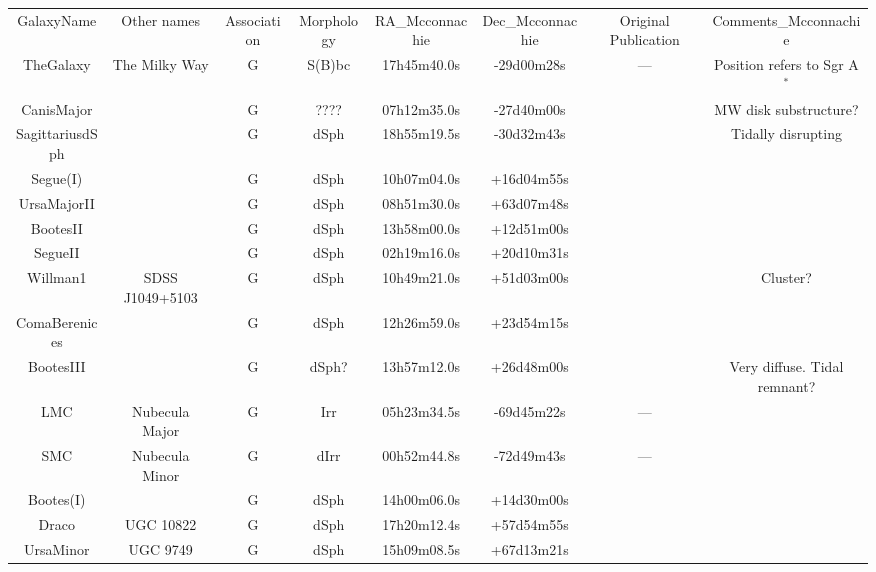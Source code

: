 \begin{table}
\begin{tabular}{cccccccc}\\
GalaxyName & Other names & Association & Morphology & RA_Mcconnachie & Dec_Mcconnachie & Original Publication & Comments_Mcconnachie\\
TheGalaxy            & The Milky Way            & G &S(B)bc& 17h45m40.0s & -29d00m28s & --- & Position refers to Sgr A$ ^*$ \\
CanisMajor           &                          & G & ???? & 07h12m35.0s & -27d40m00s &\cite{martin2004a} & MW disk substructure?\\
SagittariusdSph      &                          & G & dSph & 18h55m19.5s & -30d32m43s &\cite{ibata1994} & Tidally disrupting\\
Segue(I)             &                          & G & dSph & 10h07m04.0s & +16d04m55s &\cite{belokurov2007}&\\
UrsaMajorII         &                          & G & dSph & 08h51m30.0s & +63d07m48s &\cite{zucker2006a}&\\
BootesII             &                          & G & dSph & 13h58m00.0s & +12d51m00s &\cite{walsh2007}&\\
SegueII              &                          & G & dSph & 02h19m16.0s & +20d10m31s &\cite{belokurov2009}&\\
Willman1             & SDSS J1049+5103          & G & dSph & 10h49m21.0s & +51d03m00s &\cite{willman2005b} & Cluster?\\
ComaBerenices        &                          & G & dSph & 12h26m59.0s & +23d54m15s &\cite{belokurov2007}&\\
BootesIII            &                          & G & dSph?& 13h57m12.0s & +26d48m00s &\cite{grillmair2009} & Very diffuse. Tidal remnant?\\
LMC                   & Nubecula Major           & G & Irr & 05h23m34.5s & -69d45m22s & --- &\\
SMC                   & Nubecula Minor           & G & dIrr & 00h52m44.8s & -72d49m43s & ---&\\
Bootes(I)            &                          & G & dSph & 14h00m06.0s & +14d30m00s &\cite{belokurov2006b}&\\
Draco                 & UGC 10822                & G & dSph & 17h20m12.4s & +57d54m55s &\cite{wilson1955}&\\ %
UrsaMinor            & UGC 9749                 & G & dSph & 15h09m08.5s & +67d13m21s &\cite{wilson1955}&\\ %

\end{tabular}
\end{table}
